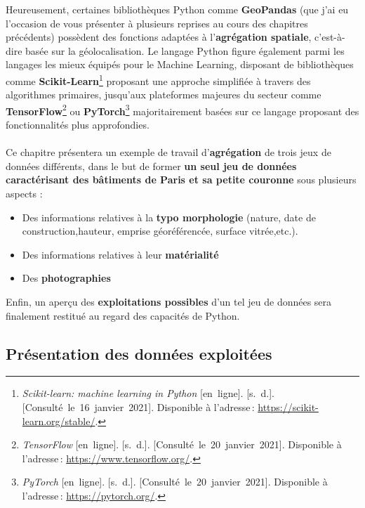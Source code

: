 \documentclass[
  11pt,
  french,
]{article}
\providecommand{\tightlist}{%
  \setlength{\itemsep}{0pt}\setlength{\parskip}{0pt}}
\begin{document}
Heureusement, certaines bibliothèques Python comme \textbf{GeoPandas}
(que j'ai eu l'occasion de vous présenter à plusieurs reprises au cours
des chapitres précédents) possèdent des fonctions adaptées à
l'\textbf{agrégation spatiale}, c'est-à-dire basée sur la
géolocalisation. Le langage Python figure également parmi les langages
les mieux équipés pour le Machine Learning, disposant de bibliothèques
comme \textbf{Scikit-Learn}\footnote{\emph{Scikit-learn: machine
  learning in Python} {[}en~ligne{]}. {[}s.~d.{]}.
  {[}Consulté~le~16~janvier~2021{]}. Disponible à l'adresse\,:
  \url{https://scikit-learn.org/stable/}.} proposant une approche
simplifiée à travers des algorithmes primaires, jusqu'aux plateformes
majeures du secteur comme \textbf{TensorFlow}\footnote{\emph{TensorFlow}
  {[}en~ligne{]}. {[}s.~d.{]}. {[}Consulté~le~20~janvier~2021{]}.
  Disponible à l'adresse\,: \url{https://www.tensorflow.org/}.} ou
\textbf{PyTorch}\footnote{\emph{PyTorch} {[}en~ligne{]}. {[}s.~d.{]}.
  {[}Consulté~le~20~janvier~2021{]}. Disponible à l'adresse\,:
  \url{https://pytorch.org/}.} majoritairement basées sur ce langage
proposant des fonctionnalités plus approfondies.\\
~\\
Ce chapitre présentera un exemple de travail d'\textbf{agrégation} de
trois jeux de données différents, dans le but de former \textbf{un seul
jeu de données caractérisant des bâtiments de Paris et sa petite
couronne} sous plusieurs aspects :

\begin{itemize}
\tightlist
\item
  Des informations relatives à la \textbf{typo morphologie} (nature,
  date de construction,hauteur, emprise géoréférencée, surface
  vitrée,etc.).
\item
  Des informations relatives à leur \textbf{matérialité}
\item
  Des \textbf{photographies}
\end{itemize}

Enfin, un aperçu des \textbf{exploitations possibles} d'un tel jeu de
données sera finalement restitué au regard des capacités de Python.

\newpage

\hypertarget{pruxe9sentation-des-donnuxe9es-exploituxe9es}{%
\subsection{Présentation des données
exploitées}\label{pruxe9sentation-des-donnuxe9es-exploituxe9es}}
\end{document}
